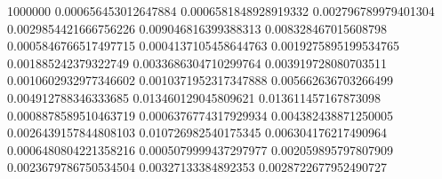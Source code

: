 {1000000 0.000656453012647884 0.0006581848928919332 0.002796789979401304 0.0029854421666756226 0.009046816399388313 0.008328467015608798 0.0005846766517497715 0.0004137105458644763 0.0019275895199534765 0.001885242379322749 0.0033686304710299764 0.003919728080703511 0.0010602932977346602 0.0010371952317347888 0.005662636703266499 0.004912788346333685 0.013460129045809621 0.013611457167873098 0.0008878589510463719 0.0006376774317929934 0.004382438871250005 0.0026439157844808103 0.010726982540175345 0.006304176217490964 0.0006480804221358216 0.0005079999437297977 0.002059895797807909 0.0023679786750534504 0.00327133384892353 0.0028722677952490727
}\dataA

